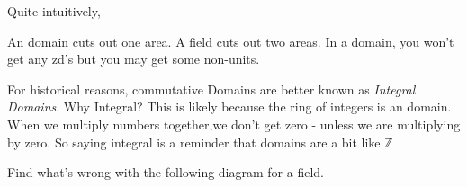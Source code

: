 Quite intuitively, 

An domain cuts out one area. A field cuts out two areas.
In a domain, you won't get any zd's but you may get some non-units.


For historical reasons, commutative Domains are better known as \textit{Integral Domains}. 
Why Integral? This is likely because the ring of integers is an domain. 
When we multiply numbers together,we don't get zero - unless we are multiplying by zero. 
So saying integral is a reminder that domains are a bit like $\mathbb{Z}$









\frmrule

\begin{example}
Find what's wrong with the following diagram for a field.
\end{example}

\frmrule




